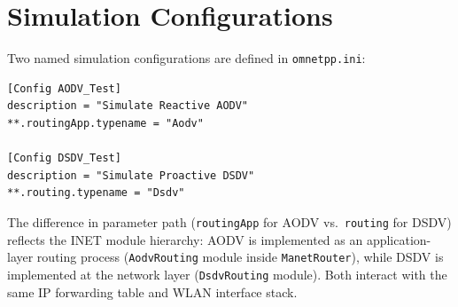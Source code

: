\section{Simulation Configurations}

Two named simulation configurations are defined in \texttt{omnetpp.ini}:

\begin{lstlisting}[caption={AODV and DSDV configuration sections in \texttt{omnetpp.ini}.}]
[Config AODV_Test]
description = "Simulate Reactive AODV"
**.routingApp.typename = "Aodv"

[Config DSDV_Test]
description = "Simulate Proactive DSDV"
**.routing.typename = "Dsdv"
\end{lstlisting}

The difference in parameter path (\texttt{routingApp} for AODV vs.\ \texttt{routing}
for DSDV) reflects the INET module hierarchy: AODV is implemented as an
application-layer routing process (\texttt{AodvRouting} module inside
\texttt{ManetRouter}), while DSDV is implemented at the network layer
(\texttt{DsdvRouting} module). Both interact with the same IP forwarding table and WLAN
interface stack.
